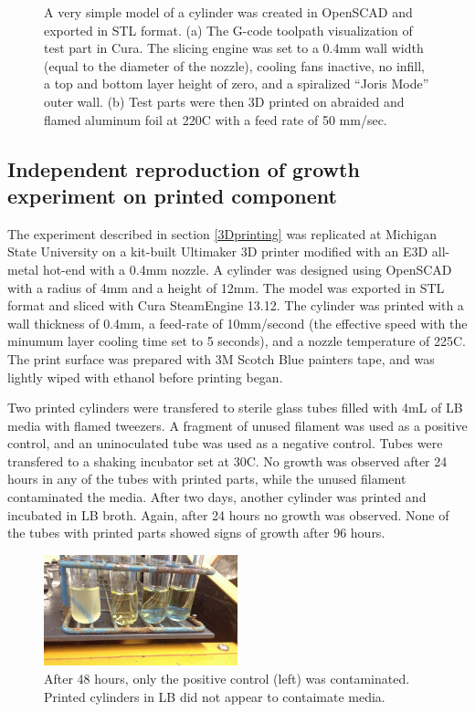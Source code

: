 \documentclass[fleqn,10pt]{wlpeerj}
\begin{document}
\begin{figure}
    \caption{A very simple model of a cylinder was created in OpenSCAD and 
    exported in STL format. (a) The G-code toolpath visualization of test part
    in Cura. The slicing engine was set to a 0.4mm wall width (equal to the 
    diameter of the nozzle), cooling fans inactive, no infill, a top and bottom
    layer height of zero, and a spiralized ``Joris Mode'' outer wall. (b) Test
    parts were then 3D printed on abraided and flamed aluminum foil at 220C with
    a feed rate of 50 mm/sec. }
 
    \label{fig:3Dparts}
\end{figure}

\subsection{Independent reproduction of growth experiment on printed component}

The experiment described in section \ref{3Dprinting} was replicated at
Michigan State University on a kit-built Ultimaker 3D printer modified with an
E3D all-metal hot-end with a 0.4mm nozzle. A cylinder was designed using
OpenSCAD with a radius of 4mm and a height of 12mm. The model was exported in
STL format and sliced with Cura SteamEngine 13.12. The cylinder was printed
with a wall thickness of 0.4mm, a feed-rate of 10mm/second (the effective
speed with the minumum layer cooling time set to 5 seconds), and a nozzle
temperature of 225C. The print surface was prepared with 3M Scotch Blue
painters tape, and was lightly wiped with ethanol before printing began.

Two printed cylinders were transfered to sterile glass tubes filled with 4mL
of LB media with flamed tweezers. A fragment of unused filament was used as a
positive control, and an uninoculated tube was used as a negative control.
Tubes were transfered to a shaking incubator set at 30C. No growth was
observed after 24 hours in any of the tubes with printed parts, while the
unused filament contaminated the media. After two days, another cylinder was
printed and incubated in LB broth. Again, after 24 hours no growth was
observed. None of the tubes with printed parts showed signs of growth after 96
hours.

\begin{figure}[h!]
  \centering
    \includegraphics[width=0.5\textwidth]{Fig6}

    \caption{After 48 hours, only the positive control (left) was
    contaminated. Printed cylinders in LB did not appear to contaimate
    media.}

\end{figure}
\end{document}

